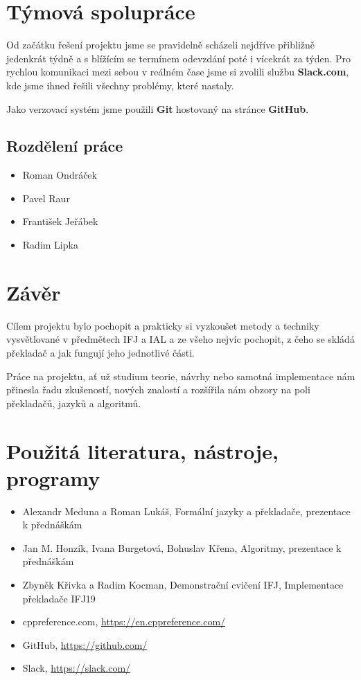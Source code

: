 \documentclass[12pt]{article}
\begin{document}
\section{Týmová spolupráce}
Od začátku řešení projektu jsme se pravidelně scházeli nejdříve přibližně jedenkrát týdně a s blížícím se termínem odevzdání poté i vícekrát za týden. Pro rychlou komunikaci mezi sebou v reálném čase jsme si zvolili službu \textbf{Slack.com}, kde jsme ihned řešili všechny problémy, které nastaly.

Jako verzovací systém jsme použili \textbf{Git} hostovaný na stránce \textbf{GitHub}. 
\subsection{Rozdělení práce}
\begin{itemize}
  \item Roman Ondráček
  \item Pavel Raur
  \item František Jeřábek
  \item Radim Lipka
\end{itemize}
\section{Závěr}
Cílem projektu bylo pochopit a prakticky si vyzkoušet metody a techniky vysvětlované v předmětech IFJ a IAL a ze všeho nejvíc pochopit, z čeho se skládá překladač a jak fungují jeho jednotlivé části. 

Práce na projektu, ať už studium teorie, návrhy nebo samotná implementace nám přinesla řadu zkušeností, nových znalostí a rozšířila nám obzory na poli překladačů, jazyků a algoritmů.
\section{Použitá literatura, nástroje, programy}
\begin{itemize}
  \item Alexandr Meduna a Roman Lukáš, Formální jazyky a překladače, prezentace k přednáškám
  \item Jan M. Honzík, Ivana Burgetová, Bohuslav Křena, Algoritmy, prezentace k přednáškám
  \item Zbyněk Křivka a Radim Kocman, Demonstrační cvičení IFJ, Implementace překladače IFJ19 
  \item cppreference.com, \href{https://en.cppreference.com/}{https://en.cppreference.com/}
  \item GitHub, \href{https://github.com/}{https://github.com/}
  \item Slack, \href{https://slack.com/}{https://slack.com/}
\end{itemize}
\end{document}
